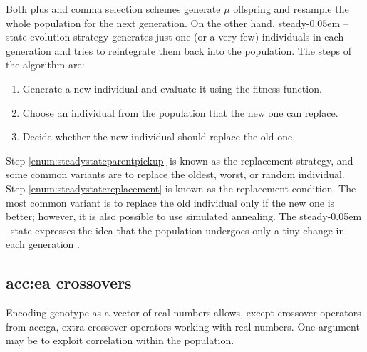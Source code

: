 Both plus and comma selection schemes generate $\mu$ offspring and resample the whole population for the next generation. On the other hand, steady\kern-0.05em --state evolution strategy generates just one (or a very few) individuals in each generation and tries to reintegrate them back into the population. The steps of the algorithm are:
\begin{enumerate}
    \item Generate a new individual and evaluate it using the fitness function.
    \item\label{enum:steadystateparentpickup} Choose an individual from the population that the new one can replace.
    \item\label{enum:steadystatereplacement} Decide whether the new individual should replace the old one.
\end{enumerate}
Step \ref{enum:steadystateparentpickup} is known as the replacement strategy, and some common variants are to replace the oldest, worst, or random individual. Step \ref{enum:steadystatereplacement} is known as the replacement condition. The most common variant is to replace the old individual only if the new one is better; however, it is also possible to use simulated annealing.
The steady\kern-0.05em --state expresses the idea that the population undergoes only a tiny change in each generation \citep{SteadyStateEvolutionStrategy}.

\subsection{\texorpdfstring{\acrshort*{acc:ea} crossovers}{Crossovers}}

Encoding genotype as a vector of real numbers allows, except crossover operators from \acrshort{acc:ga}, extra crossover operators working with real numbers. One argument may be to exploit correlation within the population.

